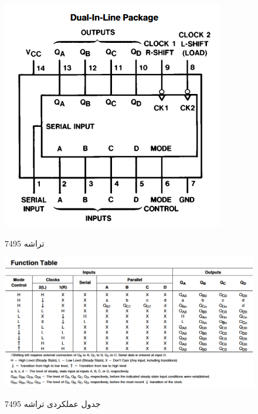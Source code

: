 \documentclass[twoside]{article}
\begin{document}
	\begin{figure}[h!]
		\begin{center}
			\includegraphics[scale=0.75]{7495_connection_diagram}‎
			\caption{تراشه 7495}
		\end{center}
	\end{figure} 
	
	\begin{figure}[h!]
		\begin{center}
			\includegraphics[scale=0.6]{7495_function_table}‎
			\caption{ جدول عملکردی تراشه 7495}
		\end{center}
	\end{figure} 
	
\end{document}
